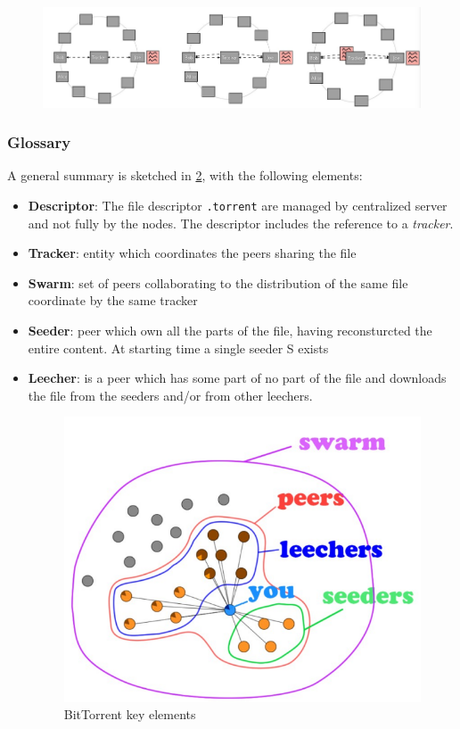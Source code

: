 \documentclass[10pt,a4paper]{report}
\begin{document}
	\begin{figure}[h!]
	\centering
	\includegraphics[scale=0.45]{images/Pasted image 20230311094106.png}
	\caption{}
	\label{example-1}
\end{figure}
\subsubsection{Glossary}\label{sec:glossary}
A general summary is sketched in \ref{cdn-components}, with the following elements:
\begin{itemize}
	\item 
	\textbf{Descriptor}: The file descriptor \texttt{.torrent} are managed by centralized server and not fully by the nodes. The descriptor includes the reference to a \textit{tracker}.
	\item 
	\textbf{Tracker}: entity which coordinates the peers sharing the file
	\item 
	\textbf{Swarm}: set of peers collaborating to the distribution of the same file coordinate by the same tracker
	\item 
	\textbf{Seeder}: peer which own all the parts of the file, having reconsturcted the entire content. At starting time a single seeder S exists
	\item 
	\textbf{Leecher}: is a peer which has some part of no part of the file and downloads the file from the seeders and/or from other leechers.
	\begin{figure}[h!]
		\centering
		\includegraphics[scale=0.35]{images/Pasted image 20230311094156.png}
		\caption{BitTorrent key elements}
		\label{cdn-components}
	\end{figure}
	
\end{itemize}
\end{document}
